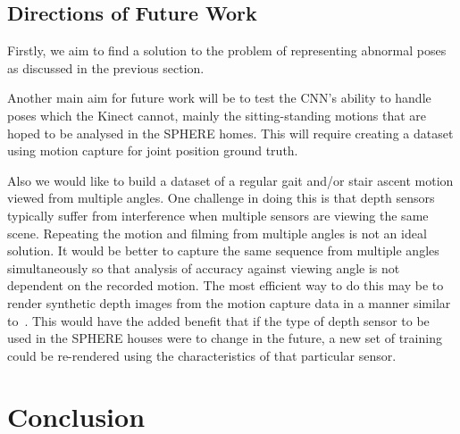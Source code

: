 \documentclass[11pt]{article} %
\begin{document}
%







\subsection{Directions of Future Work}

Firstly, we aim to find a solution to the problem of representing abnormal poses as discussed in the previous section.

Another main aim for future work will be to test the CNN's ability to handle poses which the Kinect cannot, mainly the sitting-standing motions that are hoped to be analysed in the SPHERE homes. This will require creating a dataset using motion capture for joint position ground truth. 

Also we would like to build a dataset of a regular gait and/or stair ascent motion viewed from multiple angles. One challenge in doing this is that depth sensors typically suffer from interference when multiple sensors are viewing the same scene. Repeating the motion and filming from multiple angles is not an ideal solution. It would be better to capture the same sequence from multiple angles simultaneously so that analysis of accuracy against viewing angle is not dependent on the recorded motion. The most efficient way to do this may be to render synthetic depth images from the motion capture data in a manner similar to~\cite{Blake2011}. This would have the added benefit that if the type of depth sensor to be used in the SPHERE houses were to change in the future, a new set of training could be re-rendered using the characteristics of that particular sensor.




\section{Conclusion}
\end{document}
